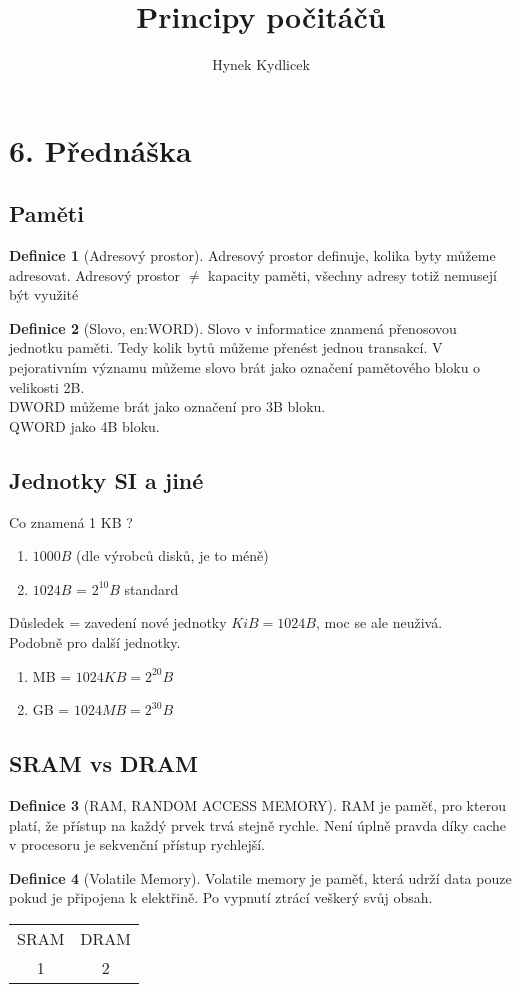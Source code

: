 \documentclass[a4paper]{article}
\author{Hynek Kydlicek}
\title{Principy počitáčů}
\theoremstyle{definition}
\newtheorem{definition}{Definice}[section]
\begin{document}
\maketitle
\section{6. Přednáška}
\subsection{Paměti}

\begin{definition}[Adresový prostor]
    Adresový prostor definuje, kolika byty můžeme adresovat.
    Adresový prostor $\neq $ kapacity paměti, všechny adresy totiž nemusejí být využité
\end{definition}
\begin{definition}[Slovo, en:WORD]
    Slovo v informatice znamená přenosovou jednotku paměti.
    Tedy kolik bytů můžeme přenést jednou transakcí.
    V pejorativním významu můžeme slovo brát jako označení pamětového bloku o velikosti 2B.
    \\
    DWORD můžeme brát jako označení pro 3B bloku.
    \\
    QWORD jako 4B bloku.
\end{definition}

\subsection{Jednotky SI a jiné}%
Co znamená 1 KB ?
\begin{enumerate}
    \item $1000B$ (dle výrobců disků, je to méně)
    \item $1024B$ = $2^{10}B$ standard
\end{enumerate}
Důsledek = zavedení nové jednotky $KiB = 1024B$, moc se ale neuživá.
\\
Podobně pro další jednotky.
\begin{enumerate}
    \item MB = $1024KB = 2^20B$
    \item GB = $1024MB = 2^30B$
\end{enumerate}
\subsection{SRAM vs DRAM}%
\begin{definition}[RAM, RANDOM ACCESS MEMORY]
    RAM je paměť, pro kterou platí, že přístup na každý prvek trvá stejně rychle.
    Není úplně pravda díky cache v procesoru je sekvenční přístup rychlejší.
\end{definition}
\begin{definition}[Volatile Memory]
    Volatile memory je paměť, která udrží data pouze pokud je připojena k elektřině.
    Po vypnutí ztrácí veškerý svůj obsah.
\end{definition}

\begin{center}
\begin{tabular}{c c}
    SRAM & DRAM\\
    1 & 2
\end{tabular}
\end{center}
\end{document}
